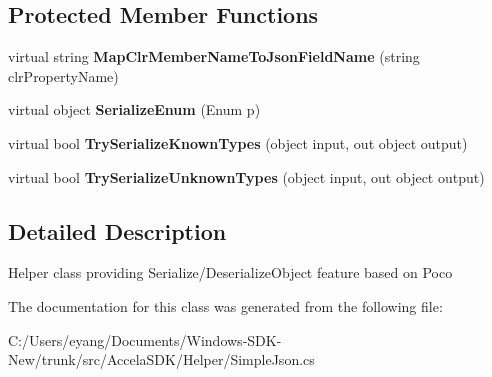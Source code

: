 \subsection*{Protected Member Functions}
\begin{DoxyCompactItemize}
\item 
\hypertarget{class_accela_1_1_windows_store_s_d_k_1_1_poco_json_serializer_strategy_ad4f8d3b268eb2dc0ad66b3c43e0c94c7}{virtual string {\bfseries Map\+Clr\+Member\+Name\+To\+Json\+Field\+Name} (string clr\+Property\+Name)}\label{class_accela_1_1_windows_store_s_d_k_1_1_poco_json_serializer_strategy_ad4f8d3b268eb2dc0ad66b3c43e0c94c7}

\item 
\hypertarget{class_accela_1_1_windows_store_s_d_k_1_1_poco_json_serializer_strategy_a95ba0a9505ba4e50a30d44044362f44f}{virtual object {\bfseries Serialize\+Enum} (Enum p)}\label{class_accela_1_1_windows_store_s_d_k_1_1_poco_json_serializer_strategy_a95ba0a9505ba4e50a30d44044362f44f}

\item 
\hypertarget{class_accela_1_1_windows_store_s_d_k_1_1_poco_json_serializer_strategy_a29784c11358d85fdad255d53ad23dceb}{virtual bool {\bfseries Try\+Serialize\+Known\+Types} (object input, out object output)}\label{class_accela_1_1_windows_store_s_d_k_1_1_poco_json_serializer_strategy_a29784c11358d85fdad255d53ad23dceb}

\item 
\hypertarget{class_accela_1_1_windows_store_s_d_k_1_1_poco_json_serializer_strategy_adf2db1064053d992800a50a3f458e79b}{virtual bool {\bfseries Try\+Serialize\+Unknown\+Types} (object input, out object output)}\label{class_accela_1_1_windows_store_s_d_k_1_1_poco_json_serializer_strategy_adf2db1064053d992800a50a3f458e79b}

\end{DoxyCompactItemize}


\subsection{Detailed Description}
Helper class providing Serialize/\+Deserialize\+Object feature based on Poco 



The documentation for this class was generated from the following file\+:\begin{DoxyCompactItemize}
\item 
C\+:/\+Users/eyang/\+Documents/\+Windows-\/\+S\+D\+K-\/\+New/trunk/src/\+Accela\+S\+D\+K/\+Helper/Simple\+Json.\+cs\end{DoxyCompactItemize}
